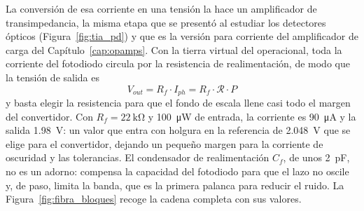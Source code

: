 La conversión de esa corriente en una tensión la hace un amplificador de transimpedancia, la misma etapa que se presentó al estudiar los detectores ópticos (Figura~\ref{fig:tia_pd}) y que es la versión para corriente del amplificador de carga del Capítulo~\ref{cap:opamps}. Con la tierra virtual del operacional, toda la corriente del fotodiodo circula por la resistencia de realimentación, de modo que la tensión de salida es
\begin{equation}\label{eq:fibra_transferencia}
    V_{out} = R_f \cdot I_{ph} = R_f \cdot \mathcal{R} \cdot P
\end{equation}
y basta elegir la resistencia para que el fondo de escala llene casi todo el margen del convertidor. Con $R_f = \SI{22}{\kilo\ohm}$ y \SI{100}{\micro\watt} de entrada, la corriente es \SI{90}{\micro\ampere} y la salida \SI{1.98}{\volt}: un valor que entra con holgura en la referencia de \SI{2.048}{\volt} que se elige para el convertidor, dejando un pequeño margen para la corriente de oscuridad y las tolerancias. El condensador de realimentación $C_f$, de unos \SI{2}{\pico\farad}, no es un adorno: compensa la capacidad del fotodiodo para que el lazo no oscile y, de paso, limita la banda, que es la primera palanca para reducir el ruido. La Figura~\ref{fig:fibra_bloques} recoge la cadena completa con sus valores.

